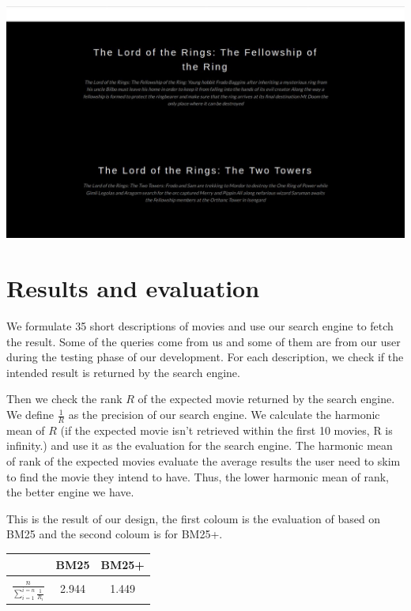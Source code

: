 \documentclass[letterpaper,10pt]{article}
\newenvironment{Figure}
  {\par\medskip\noindent\minipage{\linewidth}}
  {\endminipage\par\medskip}
\begin{document}
\begin{multicols}{2}
    \begin{Figure}
        \center
        \includegraphics[width=0.8\linewidth]{interface1.jpg}
    \end{Figure}

    \section{Results and evaluation}

    We formulate 35 short descriptions of movies and use our search engine to
    fetch the result.
    Some of the queries come from us and some of them are from our user during
    the testing phase of our development.
    For each description, we check if the intended result is returned by the
    search engine.

    Then we check the rank $R$ of the expected movie returned by the search
    engine.
    We define $\frac{1}{R}$ as the precision of our search engine.
    We calculate the harmonic mean of $R$ (if the expected movie isn’t retrieved
    within the first 10 movies, R is infinity.) and use it as the evaluation for
    the search engine.
    The harmonic mean of rank of the expected movies evaluate the average
    results the user need to skim to find the movie they intend to have.
    Thus, the lower harmonic mean of rank, the better engine we have.

    This is the result of our design, the first coloum is the evaluation of
    based on BM25 and the second coloum is for BM25+.

        
    \begin{Figure}
        \centering
        \begin{tabular}{ |c | c |c|}
            \hline
                                                           & BM25  & BM25+ \\ \hline
            $\frac{n}{\sum_{i=1}^{i=n} \frac{1}{R_{i}} } $ & 2.944 & 1.449 \\  \hline
        \end{tabular}
    \end{Figure}


\end{multicols}
\end{document}

